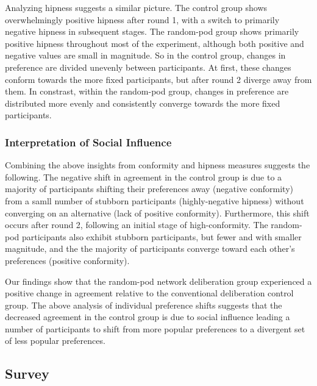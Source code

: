 {Analyzing hipness suggests a similar picture.
The control group shows overwhelmingly positive hipness after round 1, with a switch to primarily negative hipness in subsequent stages.
The random-pod group shows primarily positive hipness throughout most of the experiment, although both positive and negative values are small in magnitude.
So in the control group, changes in preference are divided unevenly between participants.
At first, these changes conform towards the more fixed participants, but after round 2 diverge away from them.
In constrast, within the random-pod group, changes in preference are distributed more evenly and consistently converge towards the more fixed participants.

\subsubsection{Interpretation of Social Influence}
\label{sec:res-interpretation}

Combining the above insights from conformity and hipness measures suggests the following.
The negative shift in agreement in the control group is due
to a majority of participants shifting their preferences away (negative conformity) from a samll number of stubborn participants (highly-negative hipness) without converging on an alternative (lack of positive conformity).
Furthermore, this shift occurs after round 2, following an initial stage of high-conformity.
The random-pod participants also exhibit stubborn participants, but fewer and with smaller magnitude,
and the the majority of participants converge toward each other's preferences (positive conformity).

Our findings show that the random-pod network deliberation group experienced a positive change in agreement relative to the conventional deliberation control group.
The above analysis of individual preference shifts suggests that the decreased agreement in the control group is due to social influence leading a number of participants to shift from more popular preferences to a divergent set of less popular preferences.

\subsection{Survey}

}
